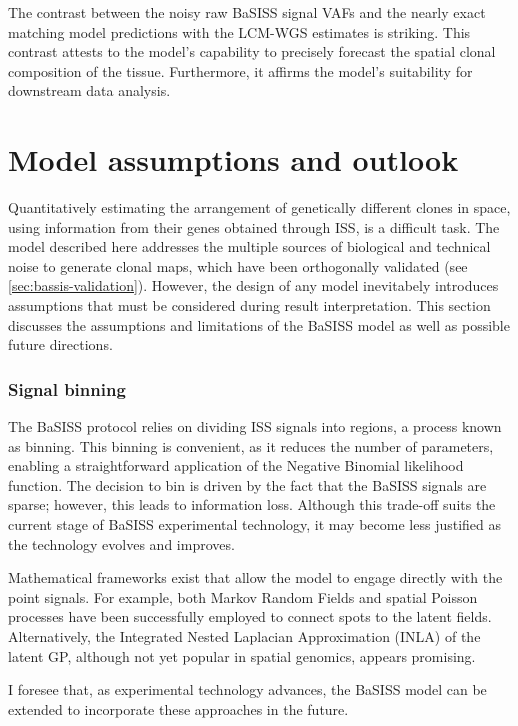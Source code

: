 The contrast between the noisy raw \ac{BaSISS} signal VAFs and the nearly exact matching model predictions with the \ac{LCM}-\ac{WGS} estimates is striking. This contrast attests to the model's capability to precisely forecast the spatial clonal composition of the tissue. Furthermore, it affirms the model's suitability for downstream data analysis.

\section{Model assumptions and outlook}

Quantitatively estimating the arrangement of genetically different clones in space, using information from their genes obtained through \ac{ISS}, is a difficult task. The model described here addresses the multiple sources of biological and technical noise to generate clonal maps, which have been orthogonally validated (see \cref{sec:bassis-validation}). However, the design of any model inevitabely introduces assumptions that must be considered during result interpretation. This section discusses the assumptions and limitations of the \ac{BaSISS} model as well as possible future directions.

\subsubsection*{Signal binning}
The \ac{BaSISS} protocol relies on dividing \ac{ISS} signals into regions, a process known as binning. This binning is convenient, as it reduces the number of parameters, enabling a straightforward application of the Negative Binomial likelihood function. The decision to bin is driven by the fact that the \ac{BaSISS} signals are sparse; however, this leads to information loss. Although this trade-off suits the current stage of \ac{BaSISS} experimental technology, it may become less justified as the technology evolves and improves.

Mathematical frameworks exist that allow the model to engage directly with the point signals. For example, both Markov Random Fields \parencite{Petukhov2022-pv} and spatial Poisson processes \parencite{Qian2020-mp} have been successfully employed to connect spots to the latent fields. Alternatively, the Integrated Nested Laplacian Approximation (INLA) \parencite{Rue2009-an} of the latent \ac{GP}, although not yet popular in spatial genomics, appears promising.

I foresee that, as experimental technology advances, the \ac{BaSISS} model can be extended to incorporate these approaches in the future.


